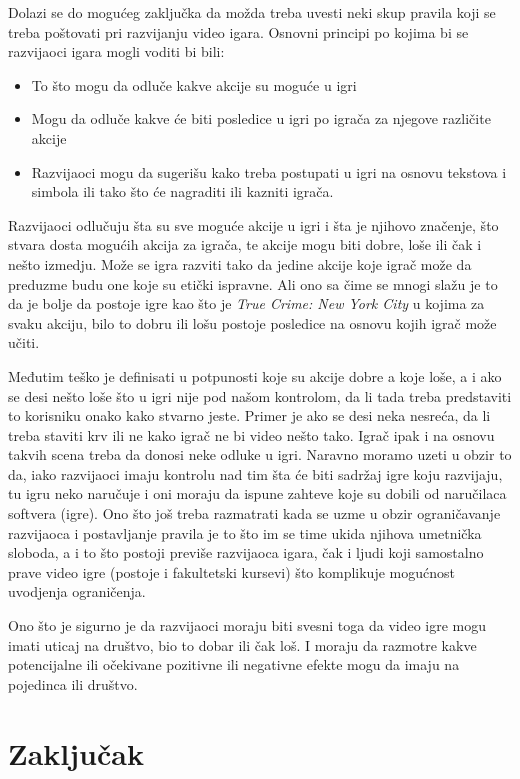\documentclass[a4paper]{article}
\begin{document}
Dolazi se do mogućeg zaključka da možda treba uvesti neki skup pravila koji se treba poštovati pri razvijanju
video igara. Osnovni principi po kojima bi se razvijaoci igara mogli voditi bi bili:
\begin{itemize}
\item To što mogu da odluče kakve akcije su moguće u igri
\item Mogu da odluče kakve će biti posledice u igri po igrača za njegove različite akcije
\item Razvijaoci mogu da sugerišu kako treba postupati u igri na osnovu tekstova i simbola ili tako 
što će nagraditi ili kazniti igrača.
\end{itemize}  
Razvijaoci odlučuju šta su sve moguće akcije u igri i šta je njihovo značenje, što stvara dosta mogućih akcija za igrača,
te akcije mogu biti dobre, loše ili čak i nešto izmedju. Može se igra razviti tako da jedine akcije koje igrač može
da preduzme budu one koje su etički ispravne. Ali ono sa čime se mnogi slažu je to da je bolje da postoje igre kao
što je {\em True Crime: New York City} u kojima za svaku akciju, bilo to dobru ili lošu postoje posledice na osnovu 
kojih igrač može učiti.

Međutim teško je definisati u potpunosti koje su akcije dobre a koje loše, a i ako se desi nešto loše što u igri
nije pod našom kontrolom, da li tada treba predstaviti to korisniku onako kako stvarno jeste. Primer je ako se 
desi neka nesreća, da li treba staviti krv ili ne kako igrač ne bi video nešto tako. Igrač ipak i na osnovu takvih 
scena treba da donosi neke odluke u igri. Naravno moramo uzeti u obzir to da, iako razvijaoci imaju kontrolu nad
tim šta će biti sadržaj igre koju razvijaju, tu igru neko naručuje i oni moraju da ispune zahteve koje su dobili od
naručilaca softvera (igre). Ono što još treba razmatrati kada se uzme u obzir ograničavanje razvijaoca i postavljanje pravila
je to što im se time ukida njihova umetnička sloboda, a i to što postoji previše razvijaoca igara, čak i ljudi koji samostalno prave video igre
(postoje i fakultetski kursevi) što komplikuje mogućnost uvodjenja ograničenja.

Ono što je sigurno je da razvijaoci moraju biti svesni toga da video igre mogu imati uticaj na društvo, bio to
dobar ili čak loš. I moraju da razmotre kakve potencijalne ili očekivane pozitivne ili negativne efekte mogu da
imaju na pojedinca ili društvo.
\newpage

\section{Zaključak}
\label{sec:zakljucak}
\end{document}
